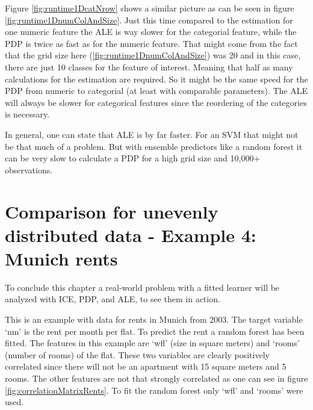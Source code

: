 \documentclass[
]{krantz}
\begin{document}
Figure \ref{fig:runtime1DcatNrow} shows a similar picture as can be seen in figure \ref{fig:runtime1DnumColAndSize}. Just this time compared to the estimation for one numeric feature the ALE is way slower for the categorial feature, while the PDP is twice as fast as for the numeric feature. That might come from the fact that the grid size here (\ref{fig:runtime1DnumColAndSize}) was 20 and in this case, there are just 10 classes for the feature of interest. Meaning that half as many calculations for the estimation are required. So it might be the same speed for the PDP from numeric to categorial (at least with comparable parameters). The ALE will always be slower for categorical features since the reordering of the categories is necessary.

In general, one can state that ALE is by far faster. For an SVM that might not be that much of a problem. But with ensemble predictors like a random forest it can be very slow to calculate a PDP for a high grid size and 10,000+ observations.

\hypertarget{comparison-for-unevenly-distributed-data---example-4-munich-rents}{%
\section{Comparison for unevenly distributed data - Example 4: Munich rents}\label{comparison-for-unevenly-distributed-data---example-4-munich-rents}}

To conclude this chapter a real-world problem with a fitted learner will be analyzed with ICE, PDP, and ALE, to see them in action.

This is an example with data for rents in Munich from 2003. The target variable `nm' is the rent per month per flat. To predict the rent a random forest has been fitted. The features in this example are `wfl' (size in square meters) and `rooms' (number of rooms) of the flat. These two variables are clearly positively correlated since there will not be an apartment with 15 square meters and 5 rooms. The other features are not that strongly correlated as one can see in figure \ref{fig:correlationMatrixRents}. To fit the random forest only `wfl' and `rooms' were used.
\end{document}
